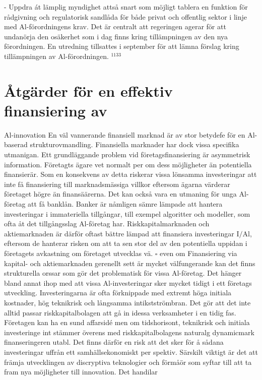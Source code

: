 {{{{{{{{{{{{{{- Uppdra át lämplig myndighet attså snart som möjligt tablera en funktion för rådgivning och regulatorisk sandlåda för både privat och offentlig sektor i linje med Al-förordningens krav. Det är centralt att regeringen agerar för att undanörja den osäkerhet som i dag finns kring tillämpningen av den nya förordningen. En utredning tillsattes i september för att lämna förslag kring tillämpningen av Al-förordningen. \({ }^{1133}\)
\section*{Åtgärder för en effektiv finansiering av}
Al-innovation
En väl vannerande finansiell marknad är av stor betydefe för en Al-baserad strukturovmandling. Finansiella marknader har dock vissa specifika utmanigan. Ett grundläggande problem vid företagsfinansiering är asymmetrisk information. Företagts ägare vet normalt per om dess möjligheter än potentiella finansierär. Som en konsekvens av detta riskerar vissa lönsamma investeringar att inte få finansiering till marknadsmässiga villkor eftersom ägarna värderar företaget högre än finansäärerna.
Det kan också vara en utmaning för unga Al-företag att få banklån. Banker är nåmligen sämre lämpade att hantera investeringar i immateriella tillgångar, till exempel algoritter och modeller, som ofta åt det tillgångsslag Al-företag har. Riskkapitalmarknaden och aktiemarknaden är därför oftast bättre lämpad att finansiera investeringar \(\mathrm{I} / \mathrm{Al}\), eftersom de hanterar risken om att ta sen stor del av den potentiella uppidan i företagets avkastning om företaget utvecklas vä.
\(\square\) even om Finansiering via kapital- och aktiemarknaden gerenellt sett är mycket välfungerande kan det finns strukturella orssar som gör det problematisk för vissa Al-företag. Det hänger bland annat ihop med att vissa Al-investeringar sker mycket tidigt i ett företags utveckling. Investeringarna är ofta förknippade med extremt höga initiala kostnader, hög teknikrisk och långsamma intikstströmbran. Det gör att det inte alltid passar riskkapitalbolagen att gå in idessa verksamheter i en tidig fas. Företagen kan ha en sund affarsidé men om tidshorisont, teknikrisk och initiala investeringe int stämmer överens med riskkapitalbolagens naturalg dynamicmark finanseringeren utabl. Det finns därför en risk att det sker för å sådana investeringar uffrån ett samhällsekonomiskt per spektiv. Särskilt viktigt är det att främja utvecklingen av discryptiva teknologier och förmåör som syftar till att ta fram nya möjligheter till innovation. Det handilar
}}}}}}}}}}}}}}

